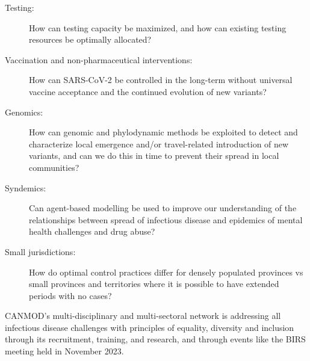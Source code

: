 \begin{description}

\item[Testing:]How can testing capacity be maximized, and how can
existing testing resources be optimally allocated?

\item[Vaccination and non-pharmaceutical interventions:]How can
SARS-CoV-2 be controlled in the long-term without universal vaccine
acceptance and the continued evolution of new variants?

\item[Genomics:]How can genomic and phylodynamic methods be exploited
to detect and characterize local emergence and/or travel-related
introduction of new variants, and can we do this in time to prevent
their spread in local communities?

\item[Syndemics:]Can agent-based modelling be used to improve our
understanding of the relationships between spread of infectious
disease and epidemics of mental health challenges and drug abuse?

\item[Small jurisdictions:]How do optimal control practices differ for
densely populated provinces vs small provinces and territories where
it is possible to have extended periods with no cases?

\end{description}

CANMOD’s multi-disciplinary and multi-sectoral network is addressing
all infectious disease challenges with principles of equality,
diversity and inclusion through its recruitment, training, and
research, and through events like the BIRS meeting held in November
2023.

